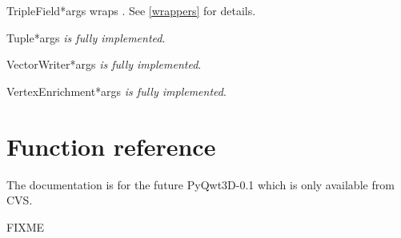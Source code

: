 \documentclass{manual}
\newcommand{\Future}{
  \begin{notice}[warning]
    The documentation is for the future PyQwt3D-0.1 which is only available
    from CVS.
  \end{notice}
}
\begin{document}
\begin{classdesc}{TripleField}{*args}
wraps . See \ref{wrappers} for details.
\end{classdesc}

\begin{classdesc}{Tuple}{*args}
\emph{is fully implemented}.
\end{classdesc}

\begin{classdesc}{VectorWriter}{*args}
\emph{is fully implemented}.
\end{classdesc}

\begin{classdesc}{VertexEnrichment}{*args}
\emph{is fully implemented}.
\end{classdesc}

\section{Function reference \label{functions}}

\Future{}

FIXME

\renewcommand{\indexname}{Index}

\end{document}
